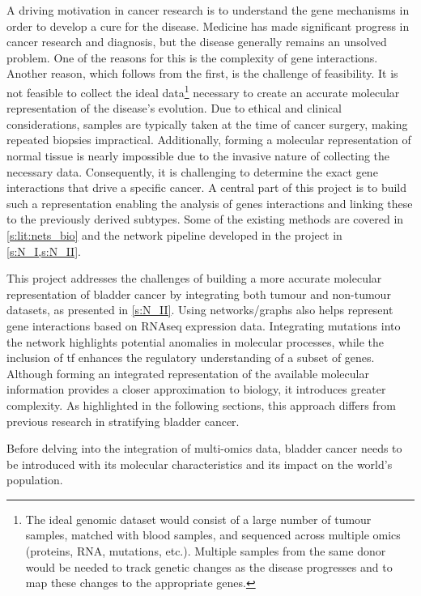 A driving motivation in cancer research is to understand the gene mechanisms in order to develop a cure for the disease. Medicine has made significant progress in cancer research and diagnosis, but the disease generally remains an unsolved problem. One of the reasons for this is the complexity of gene interactions. Another reason, which follows from the first, is the challenge of feasibility. It is not feasible to collect the ideal data\footnote{The ideal genomic dataset would consist of a large number of tumour samples, matched with blood samples, and sequenced across multiple omics (proteins, RNA, mutations, etc.). Multiple samples from the same donor would be needed to track genetic changes as the disease progresses and to map these changes to the appropriate genes.} necessary to create an accurate molecular representation of the disease's evolution. Due to ethical and clinical considerations, samples are typically taken at the time of cancer surgery, making repeated biopsies impractical. Additionally, forming a molecular representation of normal tissue is nearly impossible due to the invasive nature of collecting the necessary data. Consequently, it is challenging to determine the exact gene interactions that drive a specific cancer. A central part of this project is to build such a representation enabling the analysis of genes interactions and linking these to the previously derived subtypes. Some of the existing methods are covered in \cref{s:lit:nets_bio} and the network pipeline developed in the project in \cref{s:N_I,s:N_II}.

This project addresses the challenges of building a more accurate molecular representation of bladder cancer by integrating both tumour and non-tumour datasets, as presented in \cref{s:N_II}. Using networks/graphs also helps represent gene interactions based on RNAseq expression data. Integrating mutations into the network highlights potential anomalies in molecular processes, while the inclusion of \acrshort{tf} enhances the regulatory understanding of a subset of genes. Although forming an integrated representation of the available molecular information provides a closer approximation to biology, it introduces greater complexity. As highlighted in the following sections, this approach differs from previous research in stratifying bladder cancer.


Before delving into the integration of multi-omics data, bladder cancer needs to be introduced with its molecular characteristics and its impact on the world's population.


